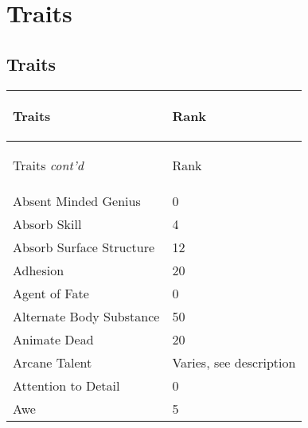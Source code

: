 \documentclass[twoside]{book}
\begin{document}
    

\chapter{Traits}
    
    

\section{Traits}
    
\begin{longtable}{p{1.25in}l} 
  Traits
  &
  \begin{turn}{70}{Rank}\end{turn}
          
  \\
  \hline
  \hline
  \endfirsthead
  Traits \textit{cont'd}
        
  &
  \begin{turn}{70}{Rank}\end{turn}
          
  \\
  \endhead
      
  \raggedright
           Absent Minded Genius 
  &
   0 
  \tabularnewline
  \hline
      
  \raggedright
           Absorb Skill 
  &
   4 
  \tabularnewline
  \hline
      
  \raggedright
           Absorb Surface Structure
           
  &
   12 
  \tabularnewline
  \hline
      
  \raggedright
           Adhesion 
  &
   20 
  \tabularnewline
  \hline
      
  \raggedright
           Agent of Fate 
  &
   0 
  \tabularnewline
  \hline
      
  \raggedright
           Alternate Body Substance
           
  &
   50 
  \tabularnewline
  \hline
      
  \raggedright
           Animate Dead 
  &
   20 
  \tabularnewline
  \hline
      
  \raggedright
           Arcane Talent 
  &
   Varies, see
           description 
  \tabularnewline
  \hline
      
  \raggedright
           Attention to Detail 
  &
   0 
  \tabularnewline
  \hline
      
  \raggedright
           Awe 
  &
   5 
  \tabularnewline
  \hline
      

\end{longtable}
\end{document}
